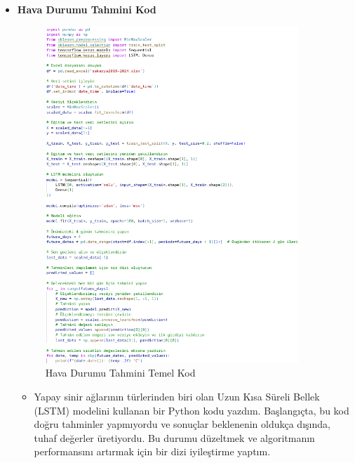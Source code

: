 \documentclass[12pt,a4paper]{article}
\begin{document}
\begin{enumerate}
\begin{itemize}
 \newpage
\item{\bf\fontsize{12pt}{14pt}\selectfont Hava Durumu Tahmini Kod} 
\begin{figure}[h]
    \centering
    \includegraphics[width=0.9\textwidth,height=0.7\textheight,keepaspectratio]{ilkkod.png}
    \caption{Hava Durumu Tahmini Temel Kod \cite{medium_weather_forecasting}}
    \label{fig:havadurum}
\end{figure}
\begin{itemize}
   

\item 
Yapay sinir ağlarının türlerinden biri olan Uzun Kısa Süreli Bellek (LSTM) modelini kullanan bir Python kodu yazdım. Başlangıçta, bu kod doğru tahminler yapmıyordu ve sonuçlar beklenenin oldukça dışında, tuhaf değerler üretiyordu. Bu durumu düzeltmek ve algoritmanın performansını artırmak için bir dizi iyileştirme yaptım.
\newpage


\end{itemize}
\end{itemize}
\end{enumerate}
\end{document}
